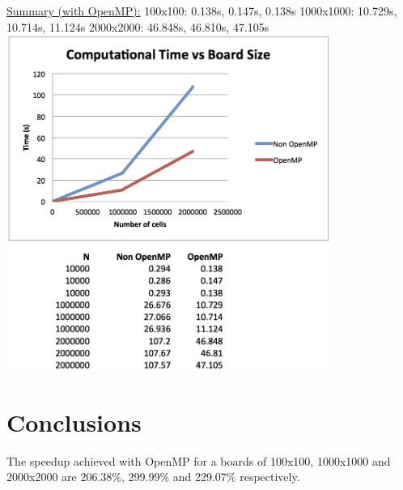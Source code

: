 \documentclass[a4paper,12pt,twoside]{report}
\begin{document}
\newline
\underline{Summary (with OpenMP):} \newline \newline
100x100:    0.138s,  0.147s,  0.138s \newline
1000x1000: 10.729s, 10.714s, 11.124s \newline
2000x2000: 46.848s, 46.810s, 47.105s \newline
\newline
\includegraphics[width=300pt]{graph.png}

\section*{Conclusions}

The speedup achieved with OpenMP for a boards of 100x100, 1000x1000 and 2000x2000 are 206.38\%, 299.99\% and 229.07\% respectively.
\end{document}
